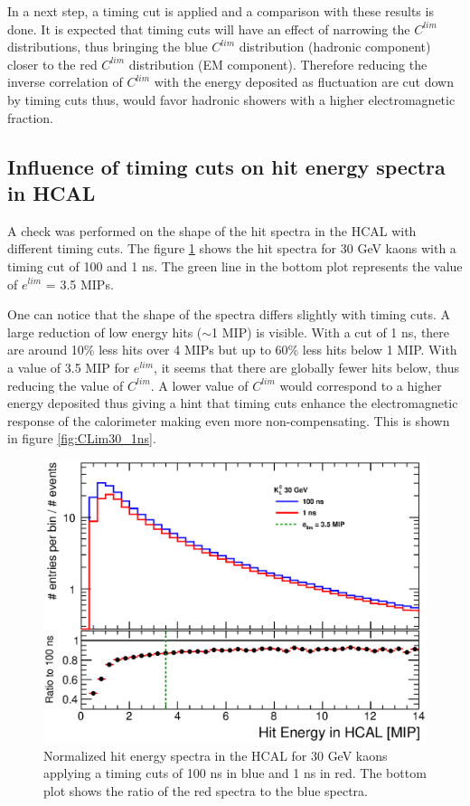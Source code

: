 In a next step, a timing cut is applied and a comparison with these results is done. It is expected that timing cuts will have an effect of narrowing the $C^{lim}$ distributions, thus bringing the blue $C^{lim}$ distribution (hadronic component) closer to the red $C^{lim}$ distribution (EM component). Therefore reducing the inverse correlation of $C^{lim}$ with the energy deposited as fluctuation are cut down by timing cuts thus, would favor hadronic showers with a higher electromagnetic fraction.

\subsection{Influence of timing cuts on hit energy spectra in HCAL}

A check was performed on the shape of the hit spectra in the HCAL with different timing cuts. The figure \ref{fig:HitSpectra30_timingcuts} shows the hit spectra for 30 GeV kaons with a timing cut of 100 and 1 ns. The green line in the bottom plot represents the value of $e^{lim}$ = 3.5 MIPs.

One can notice that the shape of the spectra differs slightly with timing cuts. A large reduction of low energy hits ($\sim$1 MIP) is visible. With a cut of 1 ns, there are around 10\% less hits over 4 MIPs but up to 60\% less hits below 1 MIP. With a value of 3.5 MIP for $e^{lim}$, it seems that there are globally fewer hits below, thus reducing the value of $C^{lim}$. A lower value of $C^{lim}$ would correspond to a higher energy deposited thus giving a hint that timing cuts enhance the electromagnetic response of the calorimeter making even more non-compensating. This is shown in figure \ref{fig:CLim30_1ns}.

\begin{figure}[htbp!]
  \centering
  \includegraphics[width=0.6\linewidth]{../Thesis_Plots/ILD/AdditionalPlots/Plots/HitEnergySpectra_Comparison_30GeV.eps}
  \caption{Normalized hit energy spectra in the HCAL for 30 GeV kaons applying a timing cuts of 100 ns in blue and 1 ns in red. The bottom plot shows the ratio of the red spectra to the blue spectra.} \label{fig:HitSpectra30_timingcuts}
\end{figure}

